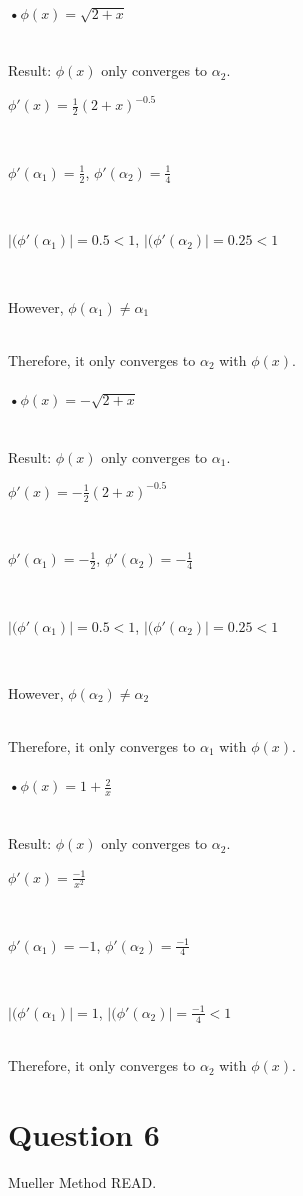 \documentclass[11pt]{article} %
\begin{document}
\paragraph{•$\phi(x) = \sqrt{2+x}$}\mbox{}\\
Result: $\phi(x)$ only converges to $\alpha_{2}$.\\
\centerline{$\phi'(x) = \frac{1}{2}(2+x)^{-0.5}$}\\\linebreak
\centerline{$\phi'(\alpha_{1}) = \frac{1}{2} $, $\phi'(\alpha_{2}) = \frac{1}{4}$}\\\linebreak
\centerline{$\mid(\phi'(\alpha_{1})\mid =0.5< 1$, $\mid(\phi'(\alpha_{2})\mid = 0.25<1$}\\\linebreak
\centerline{However, $\phi(\alpha_{1}) \neq \alpha_{1}$}\\\linebreak
Therefore, it only converges to $\alpha_{2}$ with $\phi(x)$.

\paragraph*{•$\phi(x) = -\sqrt{2+x}$}\mbox{}\\
Result: $\phi(x)$ only converges to $\alpha_{1}$.\\
\centerline{$\phi'(x) = -\frac{1}{2}(2+x)^{-0.5}$}\\\linebreak
\centerline{$\phi'(\alpha_{1}) = -\frac{1}{2} $, $\phi'(\alpha_{2}) = -\frac{1}{4}$}\\\linebreak
\centerline{$\mid(\phi'(\alpha_{1})\mid =0.5< 1$, $\mid(\phi'(\alpha_{2})\mid = 0.25<1$}\\\linebreak
\centerline{However, $\phi(\alpha_{2}) \neq \alpha_{2}$}\\\linebreak
Therefore, it only converges to $\alpha_{1}$ with $\phi(x)$.

\paragraph*{•$\phi(x) = 1+\frac{2}{x}$}\mbox{}\\
Result: $\phi(x)$ only converges to $\alpha_{2}$.\\
\centerline{$\phi'(x) = \frac{-1}{x^{2}}$}\\\linebreak
\centerline{$\phi'(\alpha_{1}) = -1 $, $\phi'(\alpha_{2}) = \frac{-1}{4}$}\\\linebreak
\centerline{$\mid(\phi'(\alpha_{1})\mid =1$, $\mid(\phi'(\alpha_{2})\mid = \frac{-1}{4}<1$}\\\linebreak
Therefore, it only converges to $\alpha_{2}$ with $\phi(x)$.


\section{Question 6}
Mueller Method READ.
\end{document}
